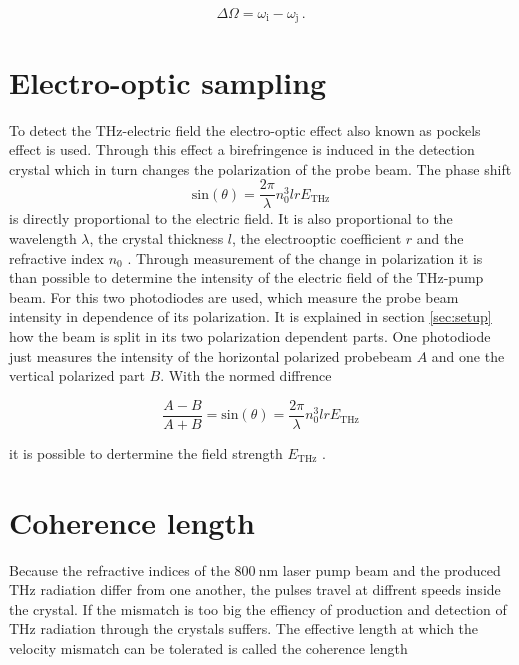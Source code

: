 \begin{equation}
    \Delta\Omega = \omega_\text{i} - \omega_\text{j} \, .
\end{equation}



\section{Electro-optic sampling}\label{sec:eos}
To detect the $\si{\tera\hertz}$-electric field the electro-optic effect also known as pockels effect is used.
Through this effect a birefringence is induced in the detection crystal which in turn changes the polarization of the probe beam.
The phase shift 
\begin{equation}
    \text{sin}(\theta) = \frac{2\pi}{\lambda} n_0^3 l r E_\text{THz}
\end{equation}
is directly proportional to the electric field. 
It is also proportional to the wavelength $\lambda$, the crystal thickness $l$, the electrooptic coefficient $r$ and the refractive index $n_0$ \cite{wiki_book}. 
Through measurement of the change in polarization it is than possible to determine the intensity of the electric field of the $\si{\tera\hertz}$-pump beam.
For this two photodiodes are used, which measure the probe beam intensity in dependence of its polarization.
It is explained in section \ref{sec:setup} how the beam is split in its two polarization dependent parts.
One photodiode just measures the intensity of the horizontal polarized probebeam $A$ and one the vertical polarized part $B$.
With the normed diffrence 

\begin{equation}
    \frac{A-B}{A+B} = \text{sin}(\theta) = \frac{2\pi}{\lambda} n_0^3 l r E_\text{THz}
    \label{eq:electricfield_A_B}
\end{equation}

it is possible to dertermine the field strength $E_\text{THz}$ \cite[7]{THZ_eltric_field}.


\section{Coherence length}
Because the refractive indices of the $\SI{800}{\nano\meter}$ laser pump beam and the produced $\si{\tera\hertz}$ radiation differ from one another, the pulses travel at diffrent speeds inside the crystal.
If the mismatch is too big the effiency of production and detection of $\si{\tera\hertz}$ radiation through the crystals suffers.
The effective length at which the velocity mismatch can be tolerated is called the coherence length

